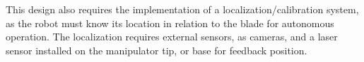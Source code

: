 

This design also requires the implementation of a localization/calibration
system, as the robot must know its location in relation to the blade for
autonomous operation. The localization requires external sensors, as cameras,
and a laser sensor installed on the manipulator tip, or base for feedback
position.





